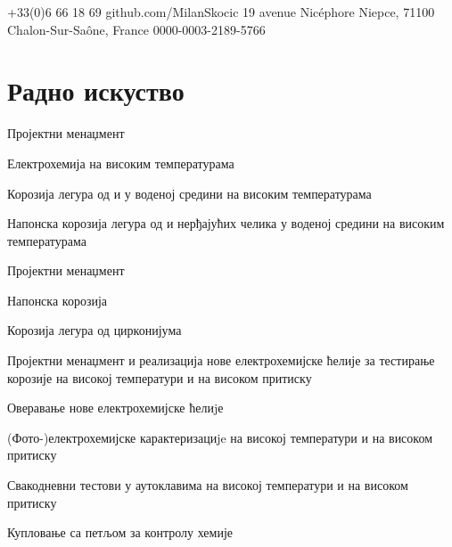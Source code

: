 \documentclass[11pt, a4paper, notitlepage]{article}
\begin{document}
\selectfont
\pagestyle{empty}
	\newpage

	
	
	{+33(0)6 66 18 69}
	{github.com/MilanSkocic}
	{19 avenue Nicéphore Niepce, 71100 Chalon-Sur-Saône, France}
	{0000-0003-2189-5766}

	\section*{Радно искуство}

	\begin{jobdetails}[T2A]
		\item Пројектни менаџмент
 		\item Електрохемија на високим температурама
		\item Корозија легура од  и  у воденој средини на високим температурама
        \item Напонска корозија легура од  и нерђајућих челика у воденој средини на високим температурама
	\end{jobdetails}
		
	\begin{jobdetails}[T2A]
		\item Пројектни менаџмент
		\item Напонска корозија 
		\item Корозија легура од цирконијума
	\end{jobdetails}

	\begin{jobdetails}[T2A]
		\item Пројектни менаџмент и реализација нове електрохемијске ћелије за тестирање корозије на високој температури и на високом притиску
		\item Оверавање нове електрохемијске ћелиjе
		\item (Фото-)електрохемијске карактеризациje на високој температури и на високом притиску
		\item Свакодневни тестови у аутоклавима на високој температури и на високом притиску
		\item Купловање са петљом за контролу хемије
	\end{jobdetails}
	
\end{document}
